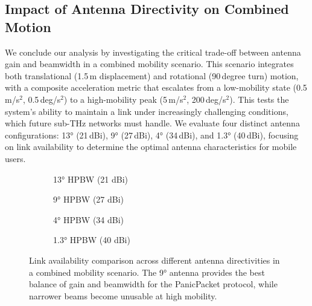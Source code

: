 \documentclass[fleqn,10pt]{wlscirep}
\begin{document}
\subsection*{Impact of Antenna Directivity on Combined Motion}

We conclude our analysis by investigating the critical trade-off between antenna gain and beamwidth in a combined mobility scenario. This scenario integrates both translational (1.5\,m displacement) and rotational (90\,degree turn) motion, with a composite acceleration metric that escalates from a low-mobility state (0.5\,m/s$^2$, 0.5\,deg/s$^2$) to a high-mobility peak (5\,m/s$^2$, 200\,deg/s$^2$). This tests the system's ability to maintain a link under increasingly challenging conditions, which future sub-THz networks must handle. We evaluate four distinct antenna configurations: 13° (21\,dBi), 9° (27\,dBi), 4° (34\,dBi), and 1.3° (40\,dBi), focusing on link availability to determine the optimal antenna characteristics for mobile users.

\begin{figure}[ht!]
    \centering
    \begin{subfigure}{0.48\linewidth}
        \centering
        
        \vspace{-25 pt}
        \caption{13° HPBW (21 dBi)}
        \label{fig:ant_13deg}
    \end{subfigure}%
    \hfill
    \begin{subfigure}{0.48\linewidth}
        \centering
        
        \vspace{-25 pt}
        \caption{9° HPBW (27 dBi)}
        \label{fig:ant_9deg}
    \end{subfigure}
    \vspace{1em}
    \begin{subfigure}{0.48\linewidth}
        \centering
        
        \vspace{-25 pt}
        \caption{4° HPBW (34 dBi)}
        \label{fig:ant_4deg}
    \end{subfigure}%
    \hfill
    \begin{subfigure}{0.48\linewidth}
        \centering
        
        \vspace{-25 pt}
        \caption{1.3° HPBW (40 dBi)}
        \label{fig:ant_1_3deg}
    \end{subfigure}
    \caption{Link availability comparison across different antenna directivities in a combined mobility scenario. The 9° antenna provides the best balance of gain and beamwidth for the PanicPacket protocol, while narrower beams become unusable at high mobility.}
    \label{fig:antenna_comparison}
\end{figure}
\end{document}
